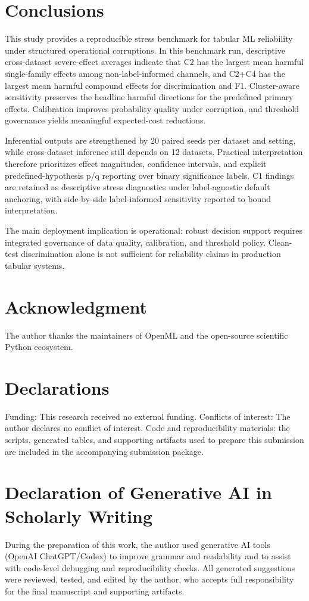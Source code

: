 \documentclass{AuthorGuide/ijitcs}
\begin{document}
\section{Conclusions}
This study provides a reproducible stress benchmark for tabular ML reliability under structured operational corruptions. In this benchmark run, descriptive cross-dataset severe-effect averages indicate that C2 has the largest mean harmful single-family effects among non-label-informed channels, and C2+C4 has the largest mean harmful compound effects for discrimination and F1. Cluster-aware sensitivity preserves the headline harmful directions for the predefined primary effects. Calibration improves probability quality under corruption, and threshold governance yields meaningful expected-cost reductions.

Inferential outputs are strengthened by 20 paired seeds per dataset and setting, while cross-dataset inference still depends on 12 datasets. Practical interpretation therefore prioritizes effect magnitudes, confidence intervals, and explicit predefined-hypothesis p/q reporting over binary significance labels. C1 findings are retained as descriptive stress diagnostics under label-agnostic default anchoring, with side-by-side label-informed sensitivity reported to bound interpretation.

The main deployment implication is operational: robust decision support requires integrated governance of data quality, calibration, and threshold policy. Clean-test discrimination alone is not sufficient for reliability claims in production tabular systems.

\section*{Acknowledgment}
The author thanks the maintainers of OpenML and the open-source scientific Python ecosystem.

\section*{Declarations}
Funding: This research received no external funding. Conflicts of interest: The author declares no conflict of interest. Code and reproducibility materials: the scripts, generated tables, and supporting artifacts used to prepare this submission are included in the accompanying submission package.

\section*{Declaration of Generative AI in Scholarly Writing}
During the preparation of this work, the author used generative AI tools (OpenAI ChatGPT/Codex) to improve grammar and readability and to assist with code-level debugging and reproducibility checks. All generated suggestions were reviewed, tested, and edited by the author, who accepts full responsibility for the final manuscript and supporting artifacts.



\end{document}
